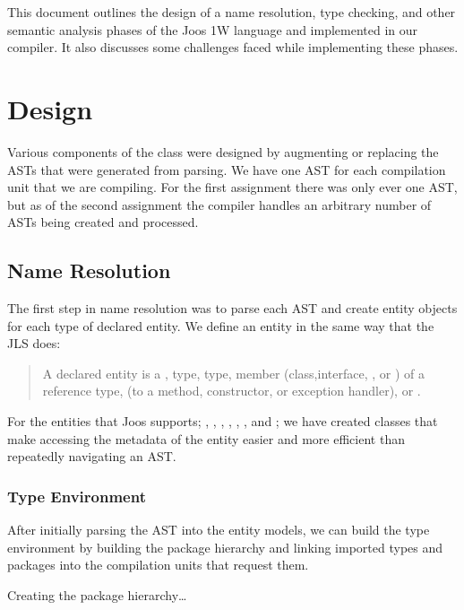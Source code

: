 \documentclass[pdftex,11pt,a4paper]{article}
\begin{document}

This document outlines the design of a name resolution, type checking,
and other semantic analysis phases of the Joos 1W language and
implemented in our compiler. It also discusses some challenges faced
while implementing these phases.


\section{Design}

Various components of the class were designed by augmenting or
replacing the ASTs that were generated from parsing. We have one AST
for each compilation unit that we are compiling. For the first
assignment there was only ever one AST, but as of the second
assignment the compiler handles an arbitrary number of ASTs being
created and processed.

\subsection{Name Resolution}

The first step in name resolution was to parse each AST and create
entity objects for each type of declared entity. We define an entity
in the same way that the JLS does:

\begin{quote}
A declared entity is a ,  type,
 type, member (class,interface, , or
) of a reference type,  (to a method,
constructor, or exception handler), or .
\end{quote}

For the entities that Joos supports; , ,
, , , , and
; we have created classes that make accessing the
metadata of the entity easier and more efficient than repeatedly
navigating an AST.


\subsubsection{Type Environment}

After initially parsing the AST into the entity models, we can build
the type environment by building the package hierarchy and linking
imported types and packages into the compilation units that request
them.

Creating the package hierarchy\ldots
\end{document}
